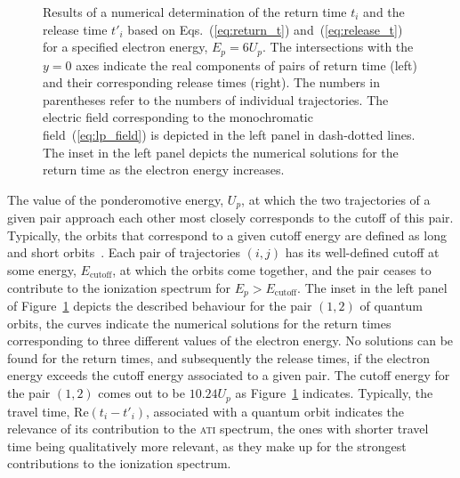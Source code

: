\begin{figure}
\begin{subfigure}[b]{0.5\linewidth}
  \end{subfigure}
  \caption{Results of a numerical determination of the return time
    $t_{i}$ and the release time $t'_{i}$ based on
    Eqs.~(\ref{eq:return_t}) and~(\ref{eq:release_t}) for a specified
    electron energy, $E_{p} = 6U_{p}$. The intersections with the $y =
    0$ axes indicate the real components of pairs of return time
    (left) and their corresponding release times (right). The numbers
    in parentheses refer to the numbers of individual
    trajectories. The electric field corresponding to the
    monochromatic field~(\ref{eq:lp_field}) is depicted in the left
    panel in dash-dotted lines. The inset in the left panel depicts
    the numerical solutions for the return time as the electron energy
    increases.}
  \label{fig:orbit_pairs}
\end{figure}
 
The value of the ponderomotive energy, $U_{p}$, at which the two
trajectories of a given pair approach each other most closely
corresponds to the cutoff of this pair. Typically, the orbits that
correspond to a given cutoff energy are defined as long and short
orbits~\cite{BeckerRescattering_2018}. Each pair of trajectories
$(i,j)$ has its well-defined cutoff at some energy,
$E_{\mathrm{cutoff}}$, at which the orbits come together, and the pair
ceases to contribute to the ionization spectrum for $E_{p} >
E_{\mathrm{cutoff}}$. The inset in the left panel of
Figure~\ref{fig:orbit_pairs} depicts the described behaviour for the
pair $(1,2)$ of quantum orbits, the curves indicate the numerical
solutions for the return times corresponding to three different values
of the electron energy. No solutions can be found for the return
times, and subsequently the release times, if the electron energy
exceeds the cutoff energy associated to a given pair. The cutoff
energy for the pair $(1,2)$ comes out to be $10.24 U_{p}$ as
Figure~\ref{fig:orbit_pairs} indicates. Typically, the travel time,
$\mathrm{Re}(t_{i} - t'_{i})$, associated with a quantum orbit
indicates the relevance of its contribution to the \textsc{ati}
spectrum, the ones with shorter travel time being qualitatively more
relevant, as they make up for the strongest contributions to the
ionization spectrum.



